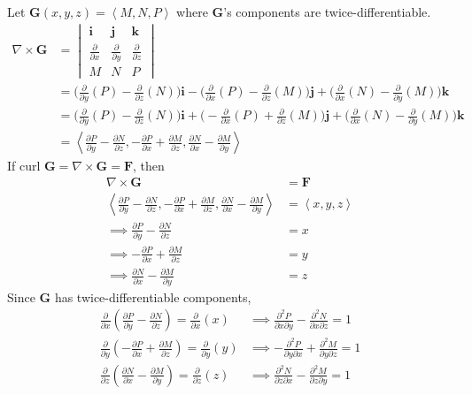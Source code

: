 \documentclass{article}
\newcommand{\lrp}[1]{\left( #1 \right)}
\newcommand{\lra}[1]{\left\langle #1 \right\rangle}
\renewcommand{\i}[0]{\mathbf{i}}
\renewcommand{\j}[0]{\mathbf{j}}
\renewcommand{\k}[0]{\mathbf{k}}
\newcommand{\F}[0]{\mathbf{F}}
\begin{document}
Let $\mathbf{G}(x,y,z)=\lra{M,N,P}$ where $\mathbf{G}$'s components are twice-differentiable.
\begin{align*}
    \nabla \times \mathbf{G} &=\begin{vmatrix}\i & \j & \k\\ \frac{\partial}{\partial x} & \frac{\partial}{\partial y}& \frac{\partial}{\partial z}\\ M & N & P\end{vmatrix}\\
    &=\Bigg(\frac{\partial }{\partial y}(P)-\frac{\partial }{\partial z}(N)\Bigg)\i-\Bigg(\frac{\partial}{\partial x}(P)-\frac{\partial}{\partial z}(M)\Bigg)\j+\Bigg(\frac{\partial}{\partial x}(N)-\frac{\partial}{\partial y}(M)\Bigg)\k\\
     &=\Bigg(\frac{\partial }{\partial y}(P)-\frac{\partial }{\partial z}(N)\Bigg)\i+\Bigg(-\frac{\partial}{\partial x}(P)+\frac{\partial}{\partial z}(M)\Bigg)\j+\Bigg(\frac{\partial}{\partial x}(N)-\frac{\partial}{\partial y}(M)\Bigg)\k\\
    &=\lra{\frac{\partial P}{\partial y}-\frac{\partial N}{\partial z}, -\frac{\partial P}{\partial x}+\frac{\partial M}{\partial z},\frac{\partial N}{\partial x}-\frac{\partial M}{\partial y}}
\end{align*}
If $\text{curl }\mathbf{G}=\nabla \times \mathbf{G} = \F$, then
\begin{align*}
    \nabla \times \mathbf{G} &= \F\\
    \lra{\frac{\partial P}{\partial y}-\frac{\partial N}{\partial z}, -\frac{\partial P}{\partial x}+\frac{\partial M}{\partial z},\frac{\partial N}{\partial x}-\frac{\partial M}{\partial y}}&=\lra{x,y,z}\\
    \implies \frac{\partial P}{\partial y}-\frac{\partial N}{\partial z}&=x\\
    \implies -\frac{\partial P}{\partial x}+\frac{\partial M}{\partial z}&= y\\
    \implies \frac{\partial N}{\partial x}-\frac{\partial M}{\partial y}&= z
\end{align*}
Since $\mathbf{G}$ has twice-differentiable components,
\begin{align*}
    \frac{\partial }{\partial x}\lrp{ \frac{\partial P}{\partial y}-\frac{\partial N}{\partial z}}=\frac{\partial }{\partial x}\lrp{x}&\implies \frac{\partial^2 P}{\partial x \partial y}- \frac{\partial ^2 N}{\partial x\partial z}=1\\
    \frac{\partial }{\partial y}\lrp{- \frac{\partial P}{\partial x}+\frac{\partial M}{\partial z}}=\frac{\partial }{\partial y}\lrp{y}&\implies -\frac{\partial^2 P}{\partial y \partial x}+ \frac{\partial ^2 M}{\partial y\partial z}=1\\
    \frac{\partial }{\partial z}\lrp{ \frac{\partial N}{\partial x}-\frac{\partial M}{\partial y}}=\frac{\partial }{\partial z}\lrp{z}&\implies \frac{\partial^2 N}{\partial z \partial x}- \frac{\partial ^2 M}{\partial z\partial y}=1
\end{align*}
\end{document}
